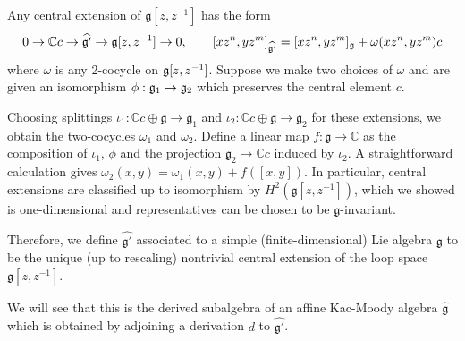 \documentclass[12pt]{article}
\begin{document}
\begin{definition}
    Any central extension of $\mathfrak{g}[z,z^{-1}]$ has the form
    \[
        0 \to \mathbb{C}c \to \widehat{\mathfrak{g}'} \to \mathfrak{g}[z,z^{-1}] \to 0,
        \qquad
    [xz^n, yz^m]_{\widehat{\mathfrak{g}'}} = [xz^n,yz^m]_{\mathfrak{g}} + \omega(xz^n,yz^m)c
    \]
    where $\omega$ is any 2-cocycle on $\mathfrak{g}[z,z^{-1}]$. Suppose we make two choices of $\omega$ and are given an isomorphism $\phi:\mathfrak{g}_1 \to \mathfrak{g}_2$ which preserves the central element $c$.

    Choosing splittings $\iota_1: \mathbb{C}c \oplus \mathfrak{g} \to \mathfrak{g}_1$ and $\iota_2: \mathbb{C}c \oplus \mathfrak{g} \to \mathfrak{g}_2$ for these extensions, we obtain the two-cocycles $\omega_1$ and $\omega_2$. Define a linear map $f: \mathfrak{g} \to \mathbb{C}$ as the composition of $\iota_1$, $\phi$ and the projection $\mathfrak{g}_2 \to \mathbb{C}c$ induced by $\iota_2$. A straightforward calculation gives $\omega_2(x,y) = \omega_1(x,y) + f([x,y])$. In particular, central extensions are classified up to isomorphism by $H^2(\mathfrak{g}[z,z^{-1}])$, which we showed is one-dimensional and representatives can be chosen to be $\mathfrak{g}$-invariant.

    Therefore, we define $\widehat{\mathfrak{g}'}$ associated to a simple (finite-dimensional) Lie algebra $\mathfrak{g}$ to be the unique (up to rescaling) nontrivial central extension of the loop space $\mathfrak{g}[z,z^{-1}]$.
\end{definition}

We will see that this is the derived subalgebra of an affine Kac-Moody algebra $\widehat{\mathfrak{g}}$ which is obtained by adjoining a derivation $d$ to $\widehat{\mathfrak{g}'}$.
\end{document}
